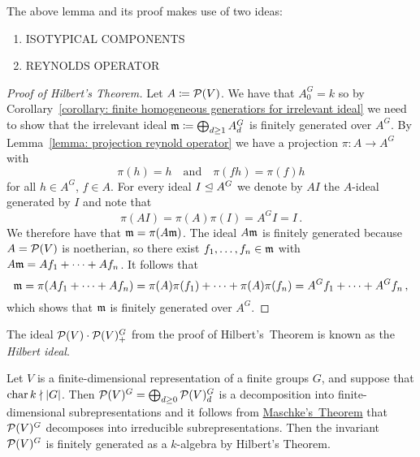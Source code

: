 \begin{remark}
  The above lemma and its proof makes use of two ideas:
  \begin{enumerate}
    \item
      ISOTYPICAL COMPONENTS
    \item
      REYNOLDS OPERATOR
  \end{enumerate}
\end{remark}


\begin{proof}[Proof of Hilbert’s Theorem]
  Let $A \coloneqq \mathcal{P}(V)$.
  We have that $A^G_0 = k$ so by Corollary~\ref{corollary: finite homogeneous generatiors for irrelevant ideal} we need to show that the irrelevant ideal $\mathfrak{m} \coloneqq \bigoplus_{d \geq 1} A^G_d$  is finitely generated over $A^G$.
  By Lemma~\ref{lemma: projection reynold operator} we have a projection $\pi \colon A \to A^G$ with
  \[
      \pi(h)
    = h
    \quad\text{and}\quad
      \pi(fh)
    = \pi(f) h
  \]
  for all $h \in A^G$, $f \in A$.
  For every ideal $I \trianglelefteq A^G$ we denote by $A I$ the $A$-ideal generated by $I$ and note that
  \begin{equation}\label{eqn: reynold ideal}
      \pi(A I)
    = \pi(A) \pi(I)
    = A^G I
    = I \,.
  \end{equation}
  We therefore have that $\mathfrak{m} = \pi(A \mathfrak{m})$.
  The ideal $A \mathfrak{m}$ is finitely generated because $A = \mathcal{P}(V)$ is noetherian, so there exist $f_1, \dotsc, f_n \in \mathfrak{m}$ with $A \mathfrak{m} = A f_1 + \dotsb + A f_n$.
  It follows that
  \[
      \mathfrak{m}
    = \pi(A f_1 + \dotsb + A f_n)
    = \pi(A) \pi(f_1) + \dotsb + \pi(A) \pi(f_n)
    = A^G f_1 + \dotsb + A^G f_n \,,
  \]
  which shows that $\mathfrak{m}$ is finitely generated over $A^G$.
\end{proof}


\begin{remark}
  The ideal $\mathcal{P}(V) \cdot \mathcal{P}(V)^G_+$ from the proof of Hilbert’s~Theorem is known as the \emph{Hilbert ideal}.
\end{remark}


\begin{example}
  \label{example: invariant ring for finite groups finitely generated}
  Let $V$ is a finite-dimensional representation of a finite groups $G$, and suppose that $\operatorname{char}{k} \nmid |G|$.
  Then $\mathcal{P}(V)^G = \bigoplus_{d \geq 0} \mathcal{P}(V)^G_d$ is a decomposition into finite-dimensional subrepresentations and it follows from \hyperref[theorem: Maschkes theorem]{Maschke’s~Theorem} that $\mathcal{P}(V)^G$ decomposes into irreducible subrepresentations.
  Then the invariant $\mathcal{P}(V)^G$ is finitely generated as a $k$-algebra by Hilbert’s Theorem.
\end{example}





